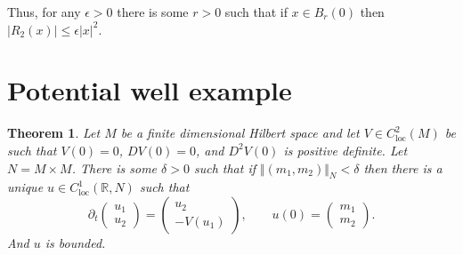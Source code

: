 \documentclass{article}
\newcommand{\norm}[1]{\Vert #1 \Vert}
\newtheorem{theorem}{Theorem}
\begin{document}
Thus, for any $\epsilon>0$ there is some $r>0$ such that if $x \in B_r(0)$ then $|R_2(x)| \leq \epsilon |x|^2$.


\section{Potential well example}

\begin{theorem}
Let $M$ be a finite dimensional Hilbert space and let $V \in C^2_{\textrm{loc}}(M)$ be such that $V(0)=0$,
$DV(0)=0$, and $D^2 V(0)$ is positive definite. Let $N=M \times M$.
There is some $\delta>0$ such that if $\norm{(m_1,m_2)}_N<\delta$ then there is a unique $u \in C^1_{\textrm{loc}} (\mathbb{R},N)$ such that
\[
\partial_t \begin{pmatrix} u_1\\u_2 \end{pmatrix}=\begin{pmatrix} u_2\\ -V(u_1) \end{pmatrix},
\qquad u(0)=\begin{pmatrix}m_1\\m_2 \end{pmatrix}.
\]
And $u$ is bounded.
\end{theorem}
\end{document}
